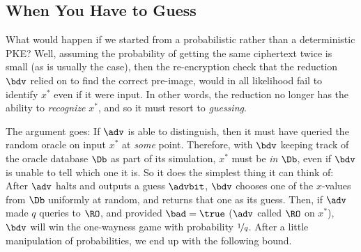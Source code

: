
\subsection{When You Have to Guess}
  What would happen if we started from a probabilistic rather than a
    deterministic PKE? Well, assuming the probability of getting the same
    ciphertext twice is small (as is usually the case), then the re-encryption
    check that the reduction $\bdv$ relied on to find the correct pre-image,
    would in all likelihood fail to identify $x^*$ even if it were input.
    In other words, the reduction no longer has the ability to \emph{recognize} $x^*$, and
    so it must resort to \emph{guessing}.

  The argument goes: If $\adv$ is able to distinguish, then it must have
    queried the random oracle on input $x^*$ at \emph{some} point. 
    Therefore, with $\bdv$ keeping track of the oracle database $\Db$
    as part of its simulation, $x^*$ must be \emph{in} $\Db$, even if $\bdv$
    is unable to tell which one it is. So it does the simplest thing it can
    think of: After $\adv$ halts and outputs a guess $\advbit$, $\bdv$ chooses
    one of the $x$-values from $\Db$ uniformly at random, and returns that one
    as its guess. Then, if $\adv$ made $q$ queries to $\RO$, and provided
    $\bad = \true$ ($\adv$ called $\RO$ on $x^*$), $\bdv$ will win the
    one-wayness game with probability $\nicefrac{1}{q}$. After a little
    manipulation of probabilities, we end up with the following bound.

